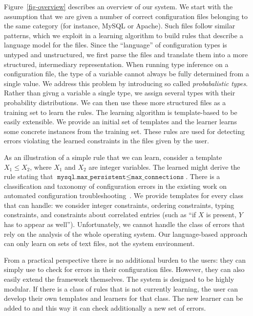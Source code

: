 Figure~\ref{fig-overview} describes an overview of our system. We start
with the assumption that we are given a number of correct configuration
files belonging to the same category (for instance, MySQL or
Apache). Such files follow similar patterns, which we exploit
in a learning algorithm to build rules that
describe a language model for the files. Since the
``language'' of configuration types is untyped and unstructured, we
first parse the files and translate them into a more structured,
intermediary representation.
When running type inference on a configuration file, the type of a variable cannot always be fully determined from a single value.
We address this problem by introducing so called {\emph{probabalistic types}}.
Rather than givng a variable a single type, we assign several types with their probability distributions. 
We can then use these more structured files
as a training set to learn the rules. The learning algorithm
is template-based to be easily extensible. We provide an initial set of templates and the
learner learns some concrete instances from the training set. These
rules are used for detecting errors violating the learned constraints
in the files given by the user.

As an 
illustration of a simple rule that we can learn, consider a template
 $X_1 \le X_2$, where $X_1$ and $X_2$ are
integer variables. The learned might derive the rule stating that
$\texttt{mysql.max\_persistent} \le \texttt{max\_connections}$. There is a classification and taxonomy of configuration errors in the 
existing work on automated configuration troubleshooting~\cite{yin11anempirical, configdataset}. We provide templates for every class that \app can handle: we consider integer constraints, ordering
constraints, typing constraints, and constraints about correlated entries (such as ``if $X$ is present, $Y$ has to appear as well''). 
Unfortunately, we cannot handle the class of errors that rely on the analysis of the whole operating system.
Our language-based approach can only learn on sets of text files, not the system environment.

From a  practical perspective there is no additional burden 
to the users: they can simply use \app to check for errors in their configuration files. However, they can also easily extend the framework themselves. The system is designed to be highly modular. If there is a class of rules that \app is not currently learning, the user can develop their own templates and learners for that class. The new learner can be added to \app and this way it can check additionally a new set of errors.

